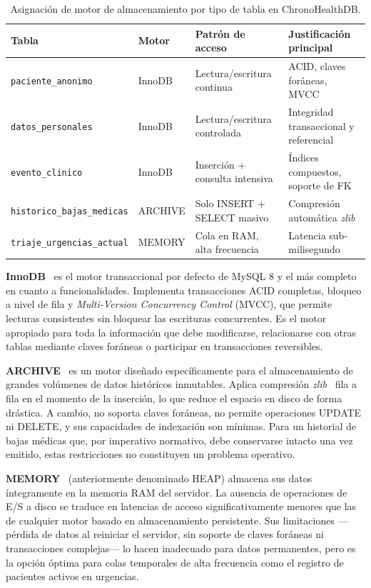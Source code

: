 \documentclass[../main.tex]{subfiles}
\begin{document}
\begin{table}[htbp]
    \centering
    \caption{Asignación de motor de almacenamiento por tipo de tabla en ChronoHealthDB.}
    \label{tab:motores}
    \small
    \begin{tabular}{lllp{5.2cm}}
        \toprule
        \textbf{Tabla} & \textbf{Motor} & \textbf{Patrón de acceso} & \textbf{Justificación principal} \\
        \midrule
        \texttt{paciente\_anonimo}         & InnoDB  & Lectura/escritura continua    & ACID, claves foráneas, MVCC \\
        \texttt{datos\_personales}         & InnoDB  & Lectura/escritura controlada  & Integridad transaccional y referencial \\
        \texttt{evento\_clinico}           & InnoDB  & Inserción + consulta intensiva & Índices compuestos, soporte de FK \\
        \texttt{historico\_bajas\_medicas} & ARCHIVE & Solo INSERT + SELECT masivo   & Compresión automática \textit{zlib} \\
        \texttt{triaje\_urgencias\_actual} & MEMORY  & Cola en RAM, alta frecuencia  & Latencia sub-milisegundo \\
        \bottomrule
    \end{tabular}
\end{table}

\textbf{InnoDB}~\cite{mysql8innodb} es el motor transaccional por defecto de MySQL 8 y el más completo en cuanto a funcionalidades. Implementa transacciones ACID completas, bloqueo a nivel de fila y \textit{Multi-Version Concurrency Control} (MVCC), que permite lecturas consistentes sin bloquear las escrituras concurrentes. Es el motor apropiado para toda la información que debe modificarse, relacionarse con otras tablas mediante claves foráneas o participar en transacciones reversibles.

\textbf{ARCHIVE}~\cite{mysql8archive} es un motor diseñado específicamente para el almacenamiento de grandes volúmenes de datos históricos inmutables. Aplica compresión \textit{zlib}~\cite{rfc1950zlib} fila a fila en el momento de la inserción, lo que reduce el espacio en disco de forma drástica. A cambio, no soporta claves foráneas, no permite operaciones UPDATE ni DELETE, y sus capacidades de indexación son mínimas. Para un historial de bajas médicas que, por imperativo normativo, debe conservarse intacto una vez emitido, estas restricciones no constituyen un problema operativo.

\textbf{MEMORY}~\cite{mysql8memory} (anteriormente denominado HEAP) almacena sus datos íntegramente en la memoria RAM del servidor. La ausencia de operaciones de E/S a disco se traduce en latencias de acceso significativamente menores que las de cualquier motor basado en almacenamiento persistente. Sus limitaciones —pérdida de datos al reiniciar el servidor, sin soporte de claves foráneas ni transacciones complejas— lo hacen inadecuado para datos permanentes, pero es la opción óptima para colas temporales de alta frecuencia como el registro de pacientes activos en urgencias.
\end{document}

